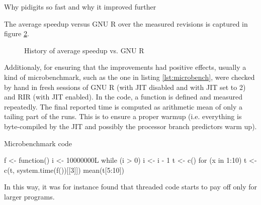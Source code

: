 \begin{figure}[htbp]
  \caption{\label{fig:}\todo}
  \centering
\end{figure}

Why pidigits so fast and why it improved further

The average speedup versus GNU R over the measured revisions is captured in figure \ref{fig:avg-speedup-history}.

\begin{figure}[htbp]
  \caption{\label{fig:avg-speedup-history}History of average speedup vs. GNU R}
  \centering
\end{figure}

Additionaly, for ensuring that the improvements had positive effects, usually a kind of microbenchmark, such as the one in listing \ref{lst:microbench}, were checked by hand in fresh sessions of GNU R (with JIT disabled and with JIT set to 2) and RIR (with JIT enabled). In the code, a function is defined and measured repeatedly. The final reported time is computed as arithmetic mean of only a tailing part of the runs. This is to ensure a proper warmup (i.e. everything is byte-compiled by the JIT and possibly the processor branch predictors warm up).

\begin{listing}[htbp]
  \caption{\label{lst:microbench}Microbenchmark code}
  \begin{rcode}
f <- function() {
    i <- 10000000L
    while (i > 0) i <- i - 1
}
t <- c()
for (x in 1:10) t <- c(t, system.time(f())[[3]])
mean(t[5:10])
  \end{rcode}
\end{listing}

In this way, it was for instance found that threaded code starts to pay off only for larger programs.
